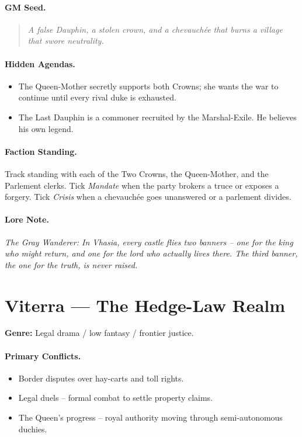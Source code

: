 \paragraph{GM Seed.}
\begin{quote}
\emph{A false Dauphin, a stolen crown, and a chevauchée that burns a village that swore neutrality.}
\end{quote}

\paragraph{Hidden Agendas.}
\begin{itemize}
  \item The Queen-Mother secretly supports both Crowns; she wants the war to continue until every rival duke is exhausted.
  \item The Last Dauphin is a commoner recruited by the Marshal-Exile. He believes his own legend.
\end{itemize}

\paragraph{Faction Standing.}
Track standing with each of the Two Crowns, the Queen-Mother, and the Parlement clerks. Tick \textit{Mandate} when the party brokers a truce or exposes a forgery. Tick \textit{Crisis} when a chevauchée goes unanswered or a parlement divides.

\paragraph{Lore Note.}
\emph{The Gray Wanderer: \textquotedbl In Vhasia, every castle flies two banners -- one for the king who might return, and one for the lord who actually lives there. The third banner, the one for the truth, is never raised.\textquotedbl}

\section{Viterra --- \textquotedbl The Hedge-Law Realm\textquotedbl}
\textbf{Genre:} Legal drama / low fantasy / frontier justice.

\paragraph{Primary Conflicts.}
\begin{itemize}
  \item Border disputes over hay-carts and toll rights.
  \item Legal duels -- formal combat to settle property claims.
  \item The Queen's progress -- royal authority moving through semi-autonomous duchies.
\end{itemize}

